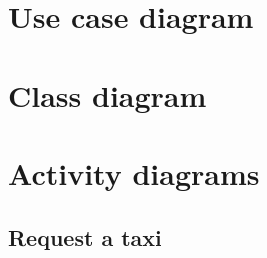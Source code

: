 \section{Use case diagram}
\begin{landscape}

\end{landscape}


\section{Class diagram}
\begin{landscape}
%

\end{landscape}
%
%
\section{Activity diagrams}
\subsection{Request a taxi}
\begin{figure}[H]
\centering
{}
\end{figure}


